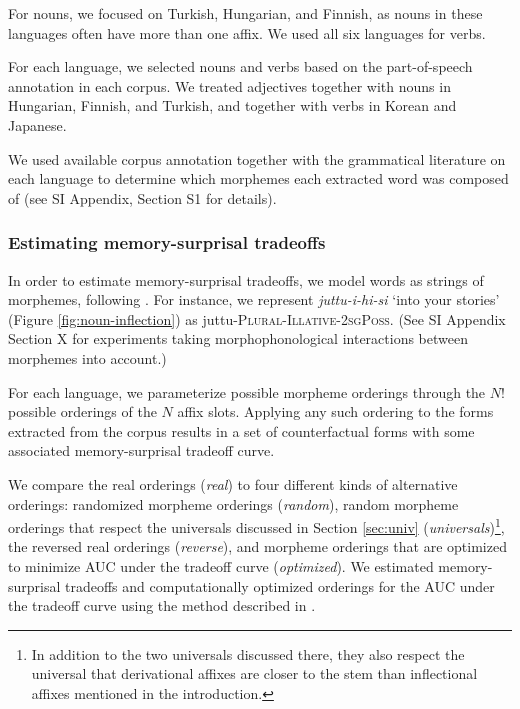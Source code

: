 \documentclass[11pt,letterpaper]{article}
\newcommand{\citet}{\Textcite}
\newcommand{\jd}[1]{\textcolor{Pink}{[jd: #1]}}
\begin{document}




For nouns, we focused on Turkish, Hungarian, and Finnish, as nouns in these languages often have more than one affix.
We used all six languages for verbs.

For each language, we selected nouns and verbs based on the part-of-speech annotation in each corpus.
We treated adjectives together with nouns in Hungarian, Finnish, and Turkish, and together with verbs in Korean and Japanese.

We used available corpus annotation together with the grammatical literature on each language to determine which morphemes each extracted word was composed of (see SI Appendix, Section S1 for details).



\subsubsection{Estimating memory-surprisal tradeoffs}

In order to estimate memory-surprisal tradeoffs, we model words as strings of morphemes, following \citet{Hahn2020modeling}.
For instance, we represent \textit{juttu-i-hi-si} `into your stories' (Figure \ref{fig:noun-inflection}) as juttu-\textsc{Plural}-\textsc{Illative}-\textsc{2sgPoss}.
(See SI Appendix Section X for experiments taking morphophonological interactions between morphemes into account.)

For each language, we parameterize possible morpheme orderings through the $N!$ possible orderings of the $N$ affix slots.
Applying any such ordering to the forms extracted from the corpus results in a set of counterfactual forms with some associated memory-surprisal tradeoff curve.


We compare the real orderings (\textit{real}) to four different kinds of alternative orderings: randomized morpheme orderings (\textit{random}), random morpheme orderings that respect the universals discussed in Section \ref{sec:univ} (\textit{universals})\footnote{In addition to the two universals discussed there, they also respect the universal that derivational affixes are closer to the stem than inflectional affixes mentioned in the introduction.}, the reversed real orderings (\textit{reverse}), and morpheme orderings that are optimized to minimize AUC under the tradeoff curve (\textit{optimized}).  We estimated memory-surprisal tradeoffs and computationally optimized orderings for the AUC under the tradeoff curve using the method described in \citet{Hahn2020modeling}.
\end{document}
